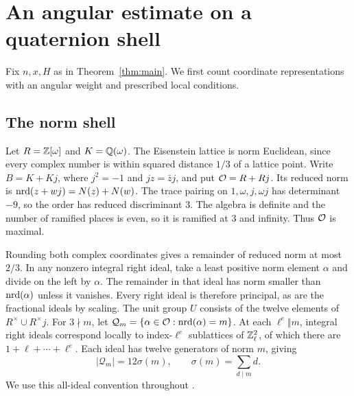 \section{An angular estimate on a quaternion shell}\label{sec:angular}
Fix \(n,x,H\) as in Theorem~\ref{thm:main}. We first count coordinate
representations with an angular weight and prescribed local conditions.

\subsection{The norm shell}
Let \(R=\mathbb Z[\omega]\) and \(K=\mathbb Q(\omega)\). The Eisenstein lattice is
norm Euclidean, since every complex number is within squared
distance \(1/3\) of a lattice point. Write \(B=K+Kj\), where
\(j^2=-1\) and \(jz=\bar z j\), and put \(\mathcal O=R+Rj\).
Its reduced norm is \(\operatorname{nrd}(z+wj)=N(z)+N(w)\). The trace pairing on
\(1,\omega,j,\omega j\) has determinant \(-9\), so the order has
reduced discriminant \(3\). The algebra is definite and the number
of ramified places is even, so it is ramified at \(3\) and infinity.
Thus \(\mathcal O\) is maximal.

Rounding both complex coordinates gives a remainder of reduced norm
at most \(2/3\). In any nonzero integral right ideal, take a least
positive norm element \(\alpha\) and divide on the left by \(\alpha\).
The remainder in that ideal has norm smaller than \(\operatorname{nrd}(\alpha)\)
unless it vanishes. Every right ideal is therefore principal, as
are the fractional ideals by scaling. The unit group \(U\) consists
of the twelve elements of \(R^\times\cup R^\times j\). For
\(3\nmid m\), let \(\mathcal Q_m=\{\alpha\in\mathcal O:\operatorname{nrd}(\alpha)=m\}\).
At each \(\ell^e\Vert m\), integral right ideals correspond locally
to index-\(\ell^e\) sublattices of \(\mathbb Z_\ell^2\), of which there are
\(1+\ell+\cdots+\ell^e\). Each ideal has twelve generators of norm
\(m\), giving
\begin{equation}\label{eq:shell}
|\mathcal Q_m|=12\sigma(m),\qquad \sigma(m)=\sum_{d\mid m}d .
\end{equation}
We use this all-ideal convention throughout
\cite[Propositions~41.3.1 and~41.3.6]{Voight}.

